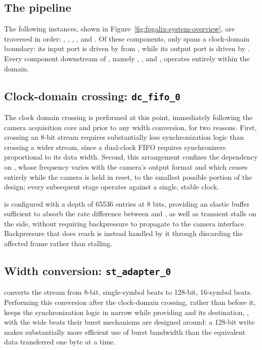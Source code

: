 \subsection{The pipeline}

The following  instances, shown in Figure~\ref{fig:fpgalix-system-overview}, are traversed in order: , , , , and . Of these components, only  spans a clock-domain boundary: its  input port is driven by  from , while its  output port is driven by . Every component downstream of , namely , , and , operates entirely within the  domain.

\subsection{Clock-domain crossing: \texttt{dc\_fifo\_0}}

The clock domain crossing is performed at this point, immediately following the camera acquisition core and prior to any width conversion, for two reasons. First, crossing an 8-bit stream requires substantially less synchronization logic than crossing a wider stream, since a dual-clock FIFO requires synchronizers proportional to its data width. Second, this arrangement confines the dependency on , whose frequency varies with the camera's output format and which ceases entirely while the camera is held in reset, to the smallest possible portion of the design; every subsequent stage operates against a single, stable clock.

 is configured with a depth of 65536 entries at 8 bits, providing an elastic buffer sufficient to absorb the rate difference between  and , as well as transient stalls on the  side, without requiring backpressure to propagate to the camera interface. Backpressure that does reach  is instead handled by it through discarding the affected frame rather than stalling.

\subsection{Width conversion: \texttt{st\_adapter\_0}}
\label{subsec:fpgalix-st-adapter}

 converts the stream from 8-bit, single-symbol beats to 128-bit, 16-symbol beats. Performing this conversion after the clock-domain crossing, rather than before it, keeps the synchronization logic in  narrow while providing  and its destination,  , with the wide beats their burst mechanisms are designed around: a 128-bit  write makes substantially more efficient use of  burst bandwidth than the equivalent data transferred one byte at a time.

